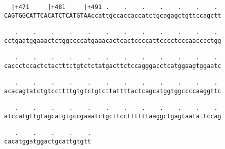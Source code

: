 \documentclass{article}
\begin{document}
\begin{Verbatim}
  |+471     |+481     |+491 .    .    .    .    .    .    . 
CAGTGGCATTCACATCTCATGTAAccattgccaccaccatctgcagagctgttccagctt
                                                            
   .    .    .    .    .    .    .    .    .    .    .    . 
cctgaatggaaactctggccccatgaaacactcactccccattcccctcccaacccctgg
                                                            
   .    .    .    .    .    .    .    .    .    .    .    . 
caccctccactctactttctgtctctatgacttctccagggacctcatggaagtggaatc
                                                            
   .    .    .    .    .    .    .    .    .    .    .    . 
acacagtatctgtccttttgtgtctgtcttattttactcagcatggtggccccaaggttc
                                                            
   .    .    .    .    .    .    .    .    .    .    .    . 
atccatgttgtagcatgtgccgaaatctgcttccttttttaaggctgagtaatattccag
                                                            
   .    .    .    .    .
cacatggatggactgcattgtgtt
                        
                        
\end{Verbatim}
\end{document}
